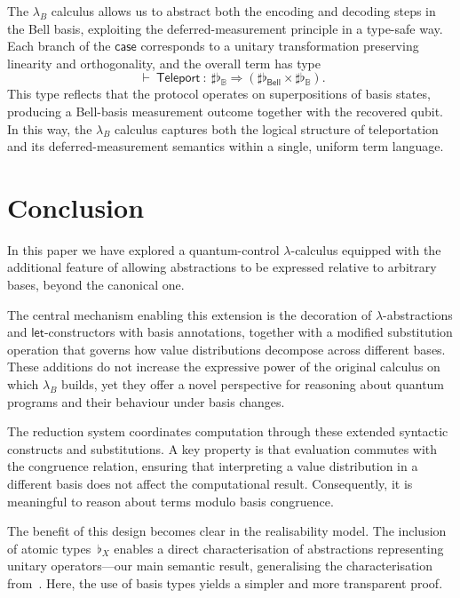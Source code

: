 \documentclass[runningheads,orivec,envcountsame,envcountsect]{llncs}
\def\Arr{\Rightarrow}
\def\TYP#1#2#3{#1~{\vdash}~#2~{:}~#3}
\newcommand\B{\mathbb B}
\newcommand{\Bell}{\mathsf{Bell}}
\newcommand{\lambdaB}{\lambda_B}
\newcommand\basis[1]{\ensuremath{\flat_{#1}}}
\begin{document}
The $\lambdaB$ calculus allows us to abstract both the encoding and decoding
steps in the Bell basis, exploiting the deferred-measurement principle in a
type-safe way.  
Each branch of the $\mathsf{case}$ corresponds to a unitary transformation
preserving linearity and orthogonality, and the overall term has type
\[
  \TYP{}{\mathsf{Teleport}}
  {\sharp\basis{\B}\Arr(\sharp\basis{\Bell}\times\sharp\basis{\B})}.
\]
This type reflects that the protocol operates on superpositions of basis
states, producing a Bell-basis measurement outcome together with the recovered
qubit.  
In this way, the $\lambdaB$ calculus captures both the logical structure of
teleportation and its deferred-measurement semantics within a single, uniform
term language.

\section{Conclusion}\label{sec:conclusion}

In this paper we have explored a quantum-control $\lambda$-calculus equipped
with the additional feature of allowing abstractions to be expressed relative
to arbitrary bases, beyond the canonical one.  

The central mechanism enabling this extension is the decoration of
$\lambda$-ab\-strac\-tions and $\mathsf{let}$-constructors with basis annotations,
together with a modified substitution operation that governs how value
distributions decompose across different bases.  
These additions do not increase the expressive power of the original calculus
on which $\lambdaB$ builds, yet they offer a novel perspective for reasoning
about quantum programs and their behaviour under basis changes.

The reduction system coordinates computation through these extended syntactic
constructs and substitutions.  
A key property is that evaluation commutes with the congruence relation,
ensuring that interpreting a value distribution in a different basis does not
affect the computational result.  
Consequently, it is meaningful to reason about terms modulo basis
congruence.

The benefit of this design becomes clear in the realisability model.
The inclusion of atomic types~$\basis{X}$ enables a direct characterisation of
abstractions representing unitary operators---our main semantic result,
generalising the characterisation from~\cite{DiazcaroGuillermoMiquelValironLICS19}.  
Here, the use of basis types yields a simpler and more transparent proof.  
\end{document}
